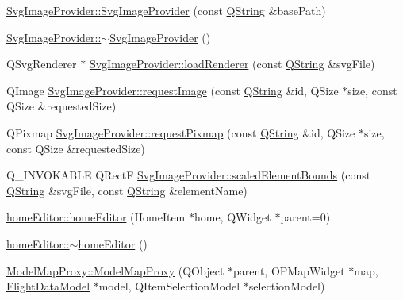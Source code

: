 \begin{DoxyCompactItemize}
\item 
\hyperlink{group___o_p_map_plugin_ga2b9c3d2098c51db2899a9d98684abb21}{\-Svg\-Image\-Provider\-::\-Svg\-Image\-Provider} (const \hyperlink{group___u_a_v_objects_plugin_gab9d252f49c333c94a72f97ce3105a32d}{\-Q\-String} \&base\-Path)
\item 
\hyperlink{group___o_p_map_plugin_gadd8520789d1a874b7a4074bfafac4ea3}{\-Svg\-Image\-Provider\-::$\sim$\-Svg\-Image\-Provider} ()
\item 
\-Q\-Svg\-Renderer $\ast$ \hyperlink{group___o_p_map_plugin_ga86ec36e3e8140373701546a7bbb0460b}{\-Svg\-Image\-Provider\-::load\-Renderer} (const \hyperlink{group___u_a_v_objects_plugin_gab9d252f49c333c94a72f97ce3105a32d}{\-Q\-String} \&svg\-File)
\item 
\-Q\-Image \hyperlink{group___o_p_map_plugin_ga47800a9f6d3722318713988d27fde449}{\-Svg\-Image\-Provider\-::request\-Image} (const \hyperlink{group___u_a_v_objects_plugin_gab9d252f49c333c94a72f97ce3105a32d}{\-Q\-String} \&id, \-Q\-Size $\ast$size, const \-Q\-Size \&requested\-Size)
\item 
\-Q\-Pixmap \hyperlink{group___o_p_map_plugin_ga8d12637852381c8b3d6682d4bed9e4c7}{\-Svg\-Image\-Provider\-::request\-Pixmap} (const \hyperlink{group___u_a_v_objects_plugin_gab9d252f49c333c94a72f97ce3105a32d}{\-Q\-String} \&id, \-Q\-Size $\ast$size, const \-Q\-Size \&requested\-Size)
\item 
\-Q\-\_\-\-I\-N\-V\-O\-K\-A\-B\-L\-E \-Q\-Rect\-F \hyperlink{group___o_p_map_plugin_gaaa6ab880f473fb953480012d1c5b8a73}{\-Svg\-Image\-Provider\-::scaled\-Element\-Bounds} (const \hyperlink{group___u_a_v_objects_plugin_gab9d252f49c333c94a72f97ce3105a32d}{\-Q\-String} \&svg\-File, const \hyperlink{group___u_a_v_objects_plugin_gab9d252f49c333c94a72f97ce3105a32d}{\-Q\-String} \&element\-Name)
\item 
\hyperlink{group___o_p_map_plugin_ga0036d5e97a686e97c193d02489b4d5fb}{home\-Editor\-::home\-Editor} (\-Home\-Item $\ast$home, \-Q\-Widget $\ast$parent=0)
\item 
\hyperlink{group___o_p_map_plugin_ga774f5e26cbfa6c2c2fe3fb6a9317abcf}{home\-Editor\-::$\sim$home\-Editor} ()
\item 
\hyperlink{group___o_p_map_plugin_gaa86a0afe448c45b8ecffde73dff2be16}{\-Model\-Map\-Proxy\-::\-Model\-Map\-Proxy} (\-Q\-Object $\ast$parent, \-O\-P\-Map\-Widget $\ast$map, \hyperlink{class_flight_data_model}{\-Flight\-Data\-Model} $\ast$model, \-Q\-Item\-Selection\-Model $\ast$selection\-Model)

\end{DoxyCompactItemize}
